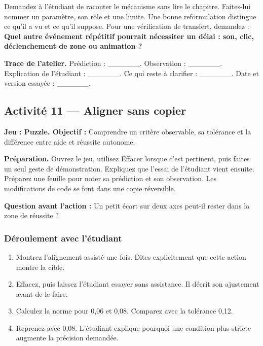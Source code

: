 \documentclass[
  canadien,
  11pt,
  letterpaper,
]{article}
\providecommand{\tightlist}{%
  \setlength{\itemsep}{0pt}\setlength{\parskip}{0pt}}
\begin{document}
Demandez à l'étudiant de raconter le mécanisme sans lire le chapitre.
Faites-lui nommer un paramètre, son rôle et une limite. Une bonne
reformulation distingue ce qu'il a vu et ce qu'il suppose. Pour une
vérification de transfert, demandez : \textbf{Quel autre événement
répétitif pourrait nécessiter un délai : son, clic, déclenchement de
zone ou animation ?}

\textbf{Trace de l'atelier.} Prédiction : \_\_\_\_\_\_. Observation :
\_\_\_\_\_\_. Explication de l'étudiant : \_\_\_\_\_\_. Ce qui reste à
clarifier : \_\_\_\_\_\_. Date et version essayée : \_\_\_\_\_\_.

\subsection{Activité 11 --- Aligner sans
copier}\label{activituxe9-11-aligner-sans-copier}

\textbf{Jeu : Puzzle. Objectif :} Comprendre un critère observable, sa
tolérance et la différence entre aide et réussite autonome.

\textbf{Préparation.} Ouvrez le jeu, utilisez Effacer lorsque c'est
pertinent, puis faites un seul geste de démonstration. Expliquez que
l'essai de l'étudiant vient ensuite. Préparez une feuille pour noter sa
prédiction et son observation. Les modifications de code se font dans
une copie réversible.

\textbf{Question avant l'action :} Un petit écart sur deux axes peut-il
rester dans la zone de réussite ?

\subsubsection{Déroulement avec
l'étudiant}\label{duxe9roulement-avec-luxe9tudiant-10}

\begin{enumerate}
\def\labelenumi{\arabic{enumi}.}
\tightlist
\item
  Montrez l'alignement assisté une fois. Dites explicitement que cette
  action montre la cible.
\item
  Effacez, puis laissez l'étudiant essayer sans assistance. Il décrit
  son ajustement avant de le faire.
\item
  Calculez la norme pour 0,06 et 0,08. Comparez avec la tolérance 0,12.
\item
  Reprenez avec 0,08. L'étudiant explique pourquoi une condition plus
  stricte augmente la précision demandée.
\end{enumerate}
\end{document}
